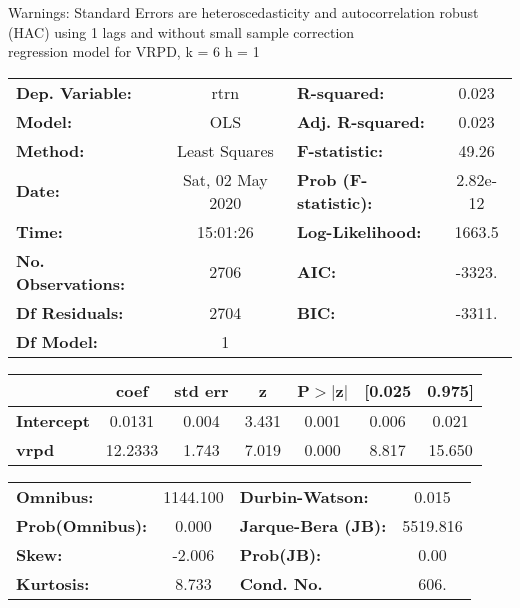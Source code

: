 Warnings: \newline
 [1] Standard Errors are heteroscedasticity and autocorrelation robust (HAC) using 1 lags and without small sample correction\\ 

regression model for VRPD, k = 6 h = 1\begin{center}
\begin{tabular}{lclc}
\toprule
\textbf{Dep. Variable:}    &       rtrn       & \textbf{  R-squared:         } &     0.023   \\
\textbf{Model:}            &       OLS        & \textbf{  Adj. R-squared:    } &     0.023   \\
\textbf{Method:}           &  Least Squares   & \textbf{  F-statistic:       } &     49.26   \\
\textbf{Date:}             & Sat, 02 May 2020 & \textbf{  Prob (F-statistic):} &  2.82e-12   \\
\textbf{Time:}             &     15:01:26     & \textbf{  Log-Likelihood:    } &    1663.5   \\
\textbf{No. Observations:} &        2706      & \textbf{  AIC:               } &    -3323.   \\
\textbf{Df Residuals:}     &        2704      & \textbf{  BIC:               } &    -3311.   \\
\textbf{Df Model:}         &           1      & \textbf{                     } &             \\
\bottomrule
\end{tabular}
\begin{tabular}{lcccccc}
                   & \textbf{coef} & \textbf{std err} & \textbf{z} & \textbf{P$> |$z$|$} & \textbf{[0.025} & \textbf{0.975]}  \\
\midrule
\textbf{Intercept} &       0.0131  &        0.004     &     3.431  &         0.001        &        0.006    &        0.021     \\
\textbf{vrpd}      &      12.2333  &        1.743     &     7.019  &         0.000        &        8.817    &       15.650     \\
\bottomrule
\end{tabular}
\begin{tabular}{lclc}
\textbf{Omnibus:}       & 1144.100 & \textbf{  Durbin-Watson:     } &    0.015  \\
\textbf{Prob(Omnibus):} &   0.000  & \textbf{  Jarque-Bera (JB):  } & 5519.816  \\
\textbf{Skew:}          &  -2.006  & \textbf{  Prob(JB):          } &     0.00  \\
\textbf{Kurtosis:}      &   8.733  & \textbf{  Cond. No.          } &     606.  \\
\bottomrule
\end{tabular}
\end{center}

